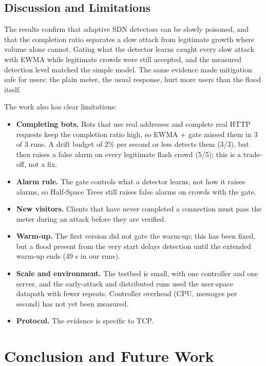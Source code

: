\documentclass[12pt,a4paper,oneside]{report}
\begin{document}
\section{Discussion and Limitations}
The results confirm that adaptive SDN detectors can be slowly poisoned, and that the completion ratio separates a slow attack from legitimate growth where volume alone cannot. Gating what the detector learns caught every slow attack with EWMA while legitimate crowds were still accepted, and the measured detection level matched the simple model. The same evidence made mitigation safe for users: the plain meter, the usual response, hurt more users than the flood itself.

The work also has clear limitations:
\begin{itemize}
\item \textbf{Completing bots.} Bots that use real addresses and complete real HTTP requests keep the completion ratio high, so EWMA + gate missed them in 3 of 3 runs. A drift budget of 2\% per second or less detects them (3/3), but then raises a false alarm on every legitimate flash crowd (5/5); this is a trade-off, not a fix.
\item \textbf{Alarm rule.} The gate controls what a detector learns, not how it raises alarms, so Half-Space Trees still raises false alarms on crowds with the gate.
\item \textbf{New visitors.} Clients that have never completed a connection must pass the meter during an attack before they are verified.
\item \textbf{Warm-up.} The first version did not gate the warm-up; this has been fixed, but a flood present from the very start delays detection until the extended warm-up ends (49 s in our runs).
\item \textbf{Scale and environment.} The testbed is small, with one controller and one server, and the early-attack and distributed runs used the user-space datapath with fewer repeats. Controller overhead (CPU, messages per second) has not yet been measured.
\item \textbf{Protocol.} The evidence is specific to TCP.
\end{itemize}

\chapter{Conclusion and Future Work}
\end{document}
